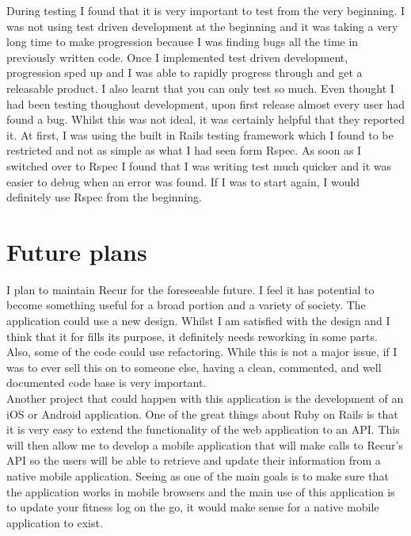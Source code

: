 During testing I found that it is very important to test from the very beginning. I was not using test driven development at the beginning and it was taking a very long time to make progression because I was finding bugs all the time in previously written code. Once I implemented test driven development, progression sped up and I was able to rapidly progress through and get a releasable product. I also learnt that you can only test so much. Even thought I had been testing thoughout development, upon first release almost every user had found a bug. Whilst this was not ideal, it was certainly helpful that they reported it. At first, I was using the built in Rails testing framework which I found to be restricted and not as simple as what I had seen form Rspec. As soon as I switched over to Rspec I found that I was writing test much quicker and it was easier to debug when an error was found. If I was to start again, I would definitely use Rspec from the beginning.

\section{Future plans}
I plan to maintain Recur for the foreseeable future. I feel it has potential to become something useful for a broad portion and a variety of society. The application could use a new design. Whilst I am satisfied with the design and I think that it for fills its purpose, it definitely needs reworking in some parts. Also, some of the code could use refactoring. While this is not a major issue, if I was to ever sell this on to someone else, having a clean, commented, and well documented code base is very important. \\

Another project that could happen with this application is the development of an iOS or Android application. One of the great things about Ruby on Rails is that it is very easy to extend the functionality of the web application to an API. This will then allow me to develop a mobile application that will make calls to Recur's API so the users will be able to retrieve and update their information from a native mobile application. Seeing as one of the main goals is to make sure that the application works in mobile browsers and the main use of this application is to update your fitness log on the go, it would make sense for a native mobile application to exist.